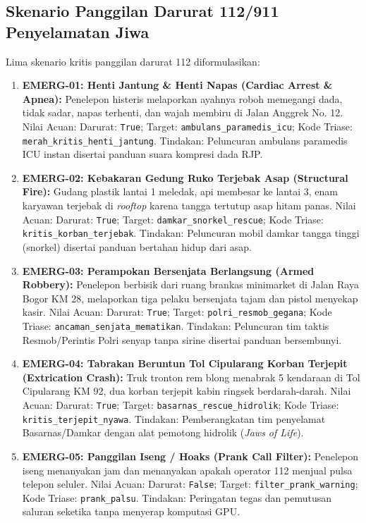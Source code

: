 \documentclass[journal,compsoc]{IEEEtran}
\begin{document}
\subsection{Skenario Panggilan Darurat 112/911 Penyelamatan Jiwa}
Lima skenario kritis panggilan darurat 112 diformulasikan:
\begin{enumerate}
    \item \textbf{EMERG-01: Henti Jantung \& Henti Napas (Cardiac Arrest \& Apnea):} Penelepon histeris melaporkan ayahnya roboh memegangi dada, tidak sadar, napas terhenti, dan wajah membiru di Jalan Anggrek No. 12. Nilai Acuan: Darurat: \texttt{True}; Target: \texttt{ambulans\_paramedis\_icu}; Kode Triase: \texttt{merah\_kritis\_henti\_jantung}. Tindakan: Peluncuran ambulans paramedis ICU instan disertai panduan suara kompresi dada RJP.
    \item \textbf{EMERG-02: Kebakaran Gedung Ruko Terjebak Asap (Structural Fire):} Gudang plastik lantai 1 meledak, api membesar ke lantai 3, enam karyawan terjebak di \textit{rooftop} karena tangga tertutup asap hitam panas. Nilai Acuan: Darurat: \texttt{True}; Target: \texttt{damkar\_snorkel\_rescue}; Kode Triase: \texttt{kritis\_korban\_terjebak}. Tindakan: Peluncuran mobil damkar tangga tinggi (snorkel) disertai panduan bertahan hidup dari asap.
    \item \textbf{EMERG-03: Perampokan Bersenjata Berlangsung (Armed Robbery):} Penelepon berbisik dari ruang brankas minimarket di Jalan Raya Bogor KM 28, melaporkan tiga pelaku bersenjata tajam dan pistol menyekap kasir. Nilai Acuan: Darurat: \texttt{True}; Target: \texttt{polri\_resmob\_gegana}; Kode Triase: \texttt{ancaman\_senjata\_mematikan}. Tindakan: Peluncuran tim taktis Resmob/Perintis Polri senyap tanpa sirine disertai panduan bersembunyi.
    \item \textbf{EMERG-04: Tabrakan Beruntun Tol Cipularang Korban Terjepit (Extrication Crash):} Truk tronton rem blong menabrak 5 kendaraan di Tol Cipularang KM 92, dua korban terjepit kabin ringsek berdarah-darah. Nilai Acuan: Darurat: \texttt{True}; Target: \texttt{basarnas\_rescue\_hidrolik}; Kode Triase: \texttt{kritis\_terjepit\_nyawa}. Tindakan: Pemberangkatan tim penyelamat Basarnas/Damkar dengan alat pemotong hidrolik (\textit{Jaws of Life}).
    \item \textbf{EMERG-05: Panggilan Iseng / Hoaks (Prank Call Filter):} Penelepon iseng menanyakan jam dan menanyakan apakah operator 112 menjual pulsa telepon seluler. Nilai Acuan: Darurat: \texttt{False}; Target: \texttt{filter\_prank\_warning}; Kode Triase: \texttt{prank\_palsu}. Tindakan: Peringatan tegas dan pemutusan saluran seketika tanpa menyerap komputasi GPU.
\end{enumerate}
\end{document}
